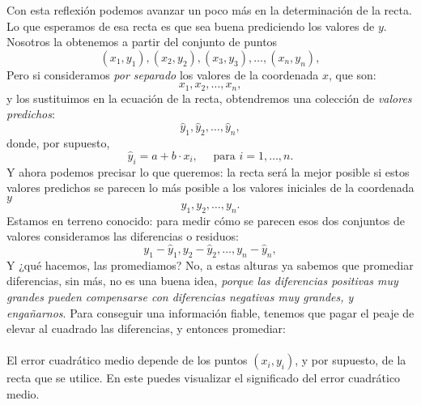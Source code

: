 \begin{itemize}
        Con esta reflexión podemos avanzar un poco más en la determinación de la recta. Lo que esperamos de esa recta es que sea buena prediciendo los valores de $y$. Nosotros la obtenemos a partir del conjunto de puntos
        \[(x_1,y_1),(x_2,y_2),(x_3,y_3),\ldots,(x_n,y_n),\]
        Pero si consideramos {\em por separado} los valores de la coordenada $x$, que son:
        \[x_1, x_2,\ldots, x_n,\]
        y los sustituimos en la ecuación de la recta, obtendremos una colección de {\em valores predichos}:
        \[\hat y_1,\hat y_2,\ldots,\hat y_n,\]
        donde, por supuesto,
        \[\hat y_i=a+b\cdot x_i,\quad\mbox{ para }i=1,\ldots,n.\]
        Y ahora podemos precisar lo que queremos: la recta será la mejor posible si estos valores predichos se parecen lo más posible a los valores iniciales de la coordenada $y$
        \[y_1, y_2,\ldots, y_n.\]
        Estamos en terreno conocido: para medir cómo se parecen esos dos conjuntos de valores consideramos las diferencias o {\sf residuos}:
        \[y_1-\hat y_1,y_2-\hat y_2,\ldots,y_n-\hat y_n,\]
        Y ¿qué hacemos, las promediamos? No, a estas alturas ya sabemos que promediar diferencias, sin más, no es una buena idea, {\em porque las diferencias positivas muy grandes pueden compensarse con diferencias negativas muy grandes, y engañarnos}. Para conseguir una información fiable, tenemos que pagar el peaje de elevar al cuadrado las diferencias, y entonces promediar:\\[3mm]
        \\[3mm]
         El error cuadrático medio depende de los puntos $(x_i,y_i)$, y por supuesto, de la recta que se utilice. En este  puedes visualizar el significado del error cuadrático medio.



\end{itemize}
